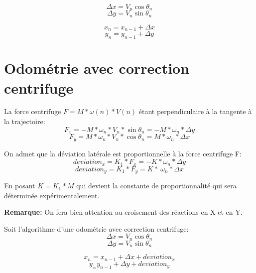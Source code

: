 \documentclass[a4paper]{report}
\begin{document}
\begin{equation}
\Delta x = V_n \cos\theta_n
\end{equation}
\begin{equation}
\Delta y = V_n \sin\theta_n
\end{equation}

\begin{equation}
x_n = x_{n-1} + \Delta x 
\end{equation}
\begin{equation}
y_n = y_{n-1} + \Delta y
\end{equation}

\section{Odométrie avec correction centrifuge}

La force centrifuge $F=M*\omega(n)*V(n)$ étant perpendiculaire à la tangente à la trajectoire:
\begin{equation}
F_x= -M*\omega_n*V_n*\sin\theta_n = -M*\omega_n*\Delta y
\end{equation}
\begin{equation}
F_y= M* \omega_n*V_n*\cos\theta_n = M* \omega_n*\Delta x
\end{equation}

On admet que la déviation latérale est proportionnelle à la force centrifuge F:
\begin{equation}
deviation_x = K_1*F_x = -K* \omega_n*\Delta y
\end{equation}
\begin{equation}
deviation_y= K_1*F_y = K*\ \omega_n*\Delta x
\end{equation}

En posant $K=K_1*M$ qui devient la constante de proportionnalité qui sera déterminée expérimentalement.

\textbf{Remarque:} On fera bien attention au croisement des réactions en X et en Y.

Soit l'algorithme d'une odométrie avec correction centrifuge:
\begin{equation}
\Delta x = V_n\cos\theta_n
\end{equation}
\begin{equation}
\Delta y = V_n\sin\theta_n
\end{equation}

\begin{equation}
x_n = x_{n-1} + \Delta x + deviation_x
\end{equation}
\begin{equation}
y_ = y_{n-1} + \Delta y + deviation_y
\end{equation}
\end{document}
